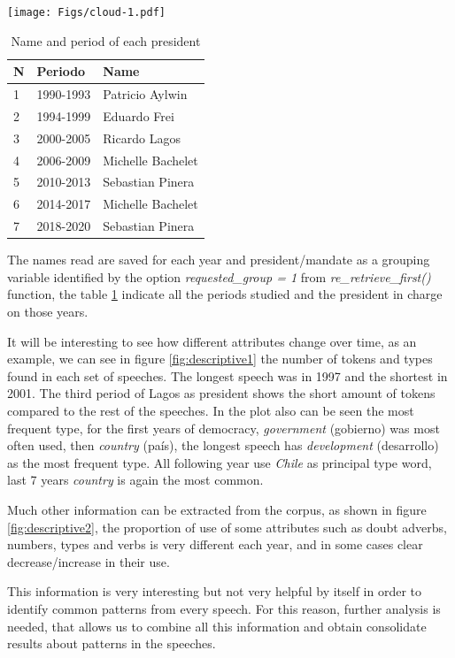 \documentclass[
  12pt,
]{article}
\begin{document}
\texttt{[image: Figs/cloud-1.pdf]}

\begin{table}[H]

\caption{\label{tab:cloud}Name and period of each president}
\begin{tabular}[t]{l|l|l}
\hline
N & Periodo & Name\\
\hline
1 & 1990-1993 & Patricio Aylwin\\
\hline
2 & 1994-1999 & Eduardo Frei\\
\hline
3 & 2000-2005 & Ricardo Lagos\\
\hline
4 & 2006-2009 & Michelle Bachelet\\
\hline
5 & 2010-2013 & Sebastian Pinera\\
\hline
6 & 2014-2017 & Michelle Bachelet\\
\hline
7 & 2018-2020 & Sebastian Pinera\\
\hline
\end{tabular}
\end{table}

The names read are saved for each year and president/mandate as a grouping variable identified by the option \emph{requested\_group = 1} from \emph{re\_retrieve\_first()} function, the table \ref{tab:cloud} indicate all the periods studied and the president in charge on those years.

It will be interesting to see how different attributes change over time, as an example, we can see in figure \ref{fig:descriptive1} the number of tokens and types found in each set of speeches. The longest speech was in 1997 and the shortest in 2001. The third period of Lagos as president shows the short amount of tokens compared to the rest of the speeches. In the plot also can be seen the most frequent type, for the first years of democracy, \emph{government} (gobierno) was most often used, then \emph{country} (país), the longest speech has \emph{development} (desarrollo) as the most frequent type. All following year use \emph{Chile} as principal type word, last 7 years \emph{country} is again the most common.

Much other information can be extracted from the corpus, as shown in figure \ref{fig:descriptive2}, the proportion of use of some attributes such as doubt adverbs, numbers, types and verbs is very different each year, and in some cases clear decrease/increase in their use.

This information is very interesting but not very helpful by itself in order to identify common patterns from every speech. For this reason, further analysis is needed, that allows us to combine all this information and obtain consolidate results about patterns in the speeches.
\end{document}
